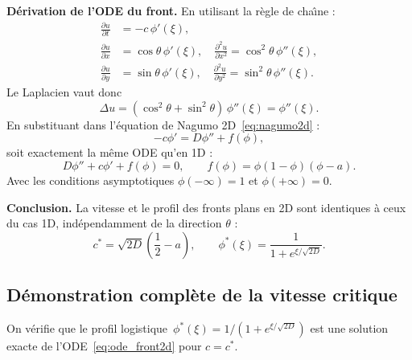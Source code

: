 \documentclass[11pt,a4paper]{report}
\begin{document}
\textbf{D\'erivation de l'ODE du front.}
En utilisant la r\`egle de cha\^{\i}ne :
\begin{align}
  \frac{\partial u}{\partial t} &= -c\,\phi'(\xi), \\
  \frac{\partial u}{\partial x} &= \cos\theta\,\phi'(\xi),\quad
  \frac{\partial^2 u}{\partial x^2} = \cos^2\theta\,\phi''(\xi), \\
  \frac{\partial u}{\partial y} &= \sin\theta\,\phi'(\xi),\quad
  \frac{\partial^2 u}{\partial y^2} = \sin^2\theta\,\phi''(\xi).
\end{align}
Le Laplacien vaut donc
\begin{equation}
  \Delta u = (\cos^2\theta + \sin^2\theta)\,\phi''(\xi) = \phi''(\xi).
\end{equation}
En substituant dans l'\'equation de Nagumo 2D~\eqref{eq:nagumo2d} :
\begin{equation}
  -c\phi' = D\phi'' + f(\phi),
\end{equation}
soit exactement la m\^eme ODE qu'en 1D :
\begin{equation}\label{eq:ode_front2d}
  \boxed{D\phi'' + c\phi' + f(\phi) = 0,\qquad f(\phi)=\phi(1-\phi)(\phi-a).}
\end{equation}
Avec les conditions asymptotiques $\phi(-\infty)=1$ et $\phi(+\infty)=0$.

\textbf{Conclusion.} La vitesse et le profil des fronts plans en 2D sont identiques
\`a ceux du cas 1D, ind\'ependamment de la direction $\theta$ :
\begin{equation}
  c^* = \sqrt{2D}\left(\frac{1}{2}-a\right),\qquad
  \phi^*(\xi) = \frac{1}{1+e^{\xi/\sqrt{2D}}}.
\end{equation}

\subsection*{D\'emonstration compl\`ete de la vitesse critique}

On v\'erifie que le profil logistique~$\phi^*(\xi)=1/(1+e^{\xi/\sqrt{2D}})$ est une
solution exacte de l'ODE~\eqref{eq:ode_front2d} pour $c=c^*$.
\end{document}
